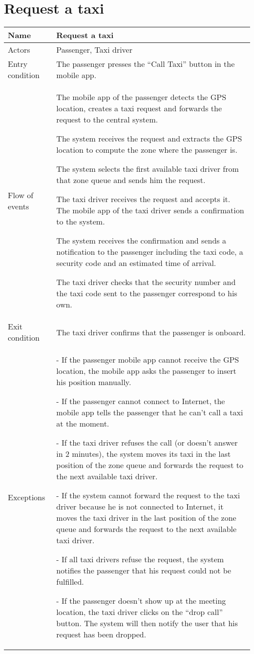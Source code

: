 \section{Request a taxi}
\begin{center}
\begin{longtable}{|l| p{9cm}|}
\hline
Name &
Request a taxi \\
\hline
Actors &
Passenger, Taxi driver \\
\hline
Entry condition & 
The passenger presses the ``Call Taxi'' button in the mobile app. \\
\hline
Flow of events &
The mobile app of the passenger detects the GPS location, creates a taxi request and forwards the request to the central system.

The system receives the request and extracts the GPS location to compute the zone where the passenger is.

The system selects the first available taxi driver from that zone queue and sends him the request.

The taxi driver receives the request and accepts it. The mobile app of the taxi driver sends a confirmation to the system.

The system receives the confirmation and sends a notification to the passenger including the taxi code, a security code and an estimated time of arrival.

The taxi driver checks that the security number and the taxi code sent to the passenger correspond to his own. \\
\hline
Exit condition &
The taxi driver confirms that the passenger is onboard. \\
\hline
Exceptions &
- If the passenger mobile app cannot receive the GPS location, the mobile app asks the passenger to insert his position manually.

- If the passenger cannot connect to Internet, the mobile app tells the passenger that he can't call a taxi at the moment.

- If the taxi driver refuses the call (or doesn't answer in 2 minutes), the system moves its taxi in the last position of the zone queue and forwards the request to the next available taxi driver.

- If the system cannot forward the request to the taxi driver because he is not connected to Internet, it moves the taxi driver in the last position of the zone queue and forwards the request to the next available taxi driver.

- If all taxi drivers refuse the request, the system notifies the passenger that his request could not be fulfilled.

- If the passenger doesn't show up at the meeting location, the taxi driver clicks on the ``drop call'' button. The system will then notify the user that his request has been dropped. \\
\hline
\end{longtable}
\end{center}


